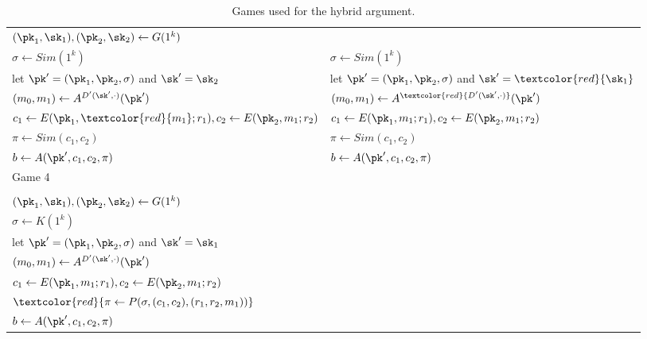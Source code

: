 \begin{table}[t!]
\begin{tabular}{l|l}
            $(\pk_1,\sk_1),(\pk_2,\sk_2) \leftarrow G(1^k)$                                         \\
            $\sigma \leftarrow {Sim(1^k)}$                                                        &
            $\sigma \leftarrow {Sim(1^k)}$                                                          \\
            let $\pk'=(\pk_1,\pk_2,\sigma)$ and $\sk'={\sk_2}$                                    &
            let $\pk'=(\pk_1,\pk_2,\sigma)$ and $\sk'=\textcolor{red}{\sk_1}$                       \\
            $(m_0,m_1) \leftarrow A^{D'(\sk',\cdot)}(\pk')$                                       &
            $(m_0,m_1) \leftarrow A^{\textcolor{red}{D'(\sk',\cdot)}}(\pk')$                        \\
            $c_1 \leftarrow E(\pk_1,\textcolor{red}{m_1};r_1), c_2 \leftarrow E(\pk_2,{m_1};r_2)$ &
            $c_1 \leftarrow E(\pk_1,{m_1};r_1), c_2 \leftarrow E(\pk_2,{m_1};r_2)$                  \\
            $\pi \leftarrow {Sim(c_1,c_2)}$                                                       &
            $\pi \leftarrow {Sim(c_1,c_2)}$                                                         \\
            $b \leftarrow A(\pk',c_1,c_2,\pi)$                                                    &
            $b \leftarrow A(\pk',c_1,c_2,\pi)$                                                      \\
            \hline
            Game 4                                                                                & \\
                                                                                                  & \\
            $(\pk_1,\sk_1),(\pk_2,\sk_2) \leftarrow G(1^k)$                                       & \\
            $\sigma \leftarrow {K(1^k)}$                                                          & \\
            let $\pk'=(\pk_1,\pk_2,\sigma)$ and $\sk'={\sk_1}$                                    & \\
            $(m_0,m_1) \leftarrow A^{D'(\sk',\cdot)}(\pk')$                                       & \\
            $c_1 \leftarrow E(\pk_1,{m_1};r_1), c_2 \leftarrow E(\pk_2,{m_1};r_2)$                & \\
            $\textcolor{red}{\pi \leftarrow {P(\sigma,(c_1,c_2),(r_1,r_2,{m_1}))}}$               & \\
            $b \leftarrow A(\pk',c_1,c_2,\pi)$                                                    & \\
        \end{tabular}
        \caption{Games used for the hybrid argument.}\label{tab:games}
    \end{table}

